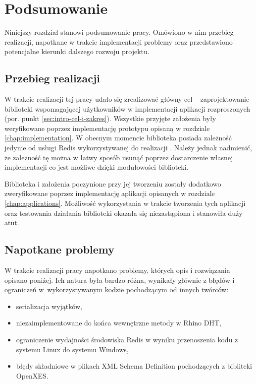 
\chapter{Podsumowanie}

Niniejszy rozdział stanowi podsumowanie pracy. Omówiono w nim przebieg
realizacji, napotkane w trakcie implementacji problemy oraz przedstawiono
potencjalne kierunki dalszego rozwoju projektu.


\section{Przebieg realizacji}

W trakcie realizacji tej pracy udało się zrealizować główny cel --
zaprojektowanie biblioteki wspomagającej użytkowników w implementacji
aplikacji rozproszonych (por. punkt \ref{sec:intro-cel-i-zakres}).
Wszystkie przyjęte założenia były weryfikowane poprzez implementację
prototypu opisaną w rozdziale \ref{chap:implementation}. W obecnym
momencie biblioteka posiada zależność jedynie od usługi Redis wykorzystywanej
do realizacji . Należy jednak nadmienić,
że zależność tę można w łatwy sposób usunąć poprzez dostarczenie własnej
implementacji  co jest możliwe dzięki
modułowości biblioteki.

Biblioteka i założenia poczynione przy jej tworzeniu zostały dodatkowo
zweryfikowane poprzez implementację aplikacji opisanych w rozdziale
\ref{chap:applications}. Możliwość wykorzystania 
w trakcie tworzenia tych aplikacji oraz testowania działania biblioteki
okazała się niezastąpiona i stanowiła duży atut.




\section{Napotkane problemy}

W trakcie realizacji pracy napotkano problemy, których opis i rozwiązania
opisano poniżej. Ich natura była bardzo różna, wynikały głównie z
błędów i ograniczeń w~wykorzystywanym kodzie pochodzącym od innych
twórców:
\begin{itemize}
\item serializacja wyjątków,
\item niezaimplementowane do końca wewnętrzne metody w Rhino DHT,
\item ograniczenie wydajności środowiska Redis w wyniku przenoszenia kodu
z systemu Linux do systemu Windows,
\item błędy składniowe w plikach XML Schema Definition pochodzących z bibliteki
OpenXES.
\end{itemize}

